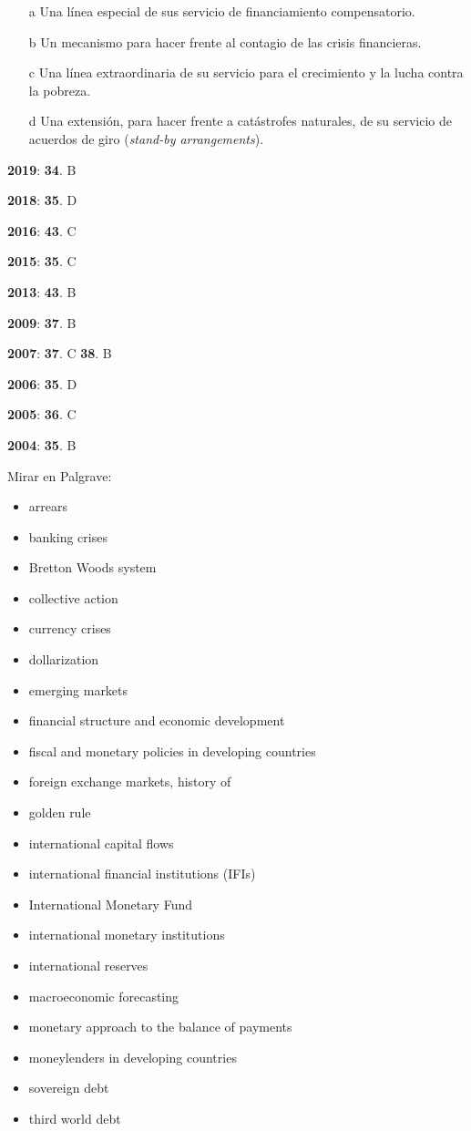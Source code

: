 \documentclass{nuevotema}
\begin{document}
\begin{enumerate}
	\item[a] Una línea especial de sus servicio de financiamiento compensatorio.
	\item[b] Un mecanismo para hacer frente al contagio de las crisis financieras.
	\item[c] Una línea extraordinaria de su servicio para el crecimiento y la lucha contra la pobreza.
	\item[d] Una extensión, para hacer frente a catástrofes naturales, de su servicio de acuerdos de giro (\textit{stand-by arrangements}).
\end{enumerate}

\notas

\textbf{2019}: \textbf{34}. B

\textbf{2018}: \textbf{35}. D

\textbf{2016}: \textbf{43}. C

\textbf{2015}: \textbf{35}. C

\textbf{2013}: \textbf{43}. B

\textbf{2009}: \textbf{37}. B

\textbf{2007}: \textbf{37}. C \textbf{38}. B

\textbf{2006}: \textbf{35}. D

\textbf{2005}: \textbf{36}. C

\textbf{2004}: \textbf{35}. B

\bibliografia

Mirar en Palgrave:
\begin{itemize}
    \item arrears
    \item banking crises
    \item Bretton Woods system
    \item collective action
    \item currency crises
    \item dollarization
    \item emerging markets
    \item financial structure and economic development
    \item fiscal and monetary policies in developing countries
    \item foreign exchange markets, history of
    \item golden rule
    \item international capital flows
    \item international financial institutions (IFIs)
    \item International Monetary Fund
    \item international monetary institutions
    \item international reserves
    \item macroeconomic forecasting
    \item monetary approach to the balance of payments
    \item moneylenders in developing countries
    \item sovereign debt
    \item third world debt
\end{itemize}
\end{document}

